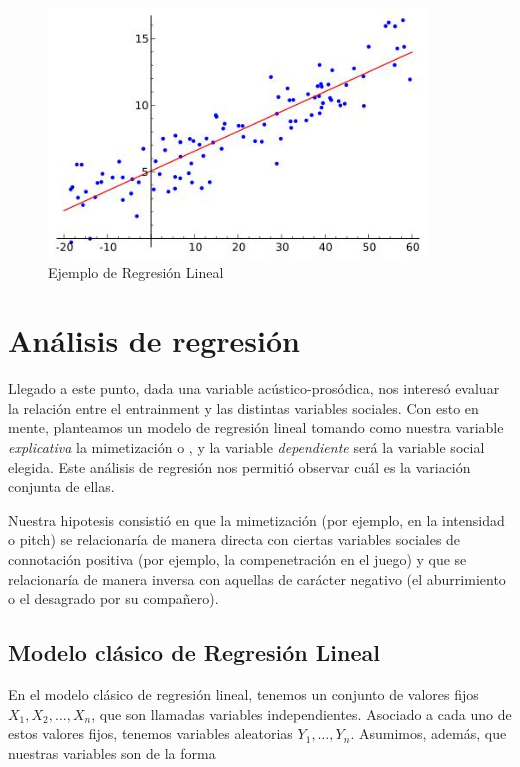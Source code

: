 
\begin{figure}[h!]
\centering
\includegraphics[width=10cm]{images/linear_regression.jpg}
\caption{Ejemplo de Regresión Lineal}
\end{figure}

\section{Análisis de regresión}

Llegado a este punto, dada una variable acústico-prosódica, nos interesó evaluar la relación entre el entrainment y las distintas variables sociales. Con esto en mente, planteamos un modelo de regresión lineal tomando como nuestra variable \emph{explicativa} la mimetización o \entrainment, y la variable \emph{dependiente} será la variable social elegida. Este análisis de regresión nos permitió observar cuál es la variación conjunta de ellas.

Nuestra hipotesis consistió en que la mimetización (por ejemplo, en la intensidad o pitch) se relacionaría de manera directa con ciertas variables sociales de connotación positiva (por ejemplo, la compenetración en el juego) y que se relacionaría de manera inversa con aquellas de carácter negativo (el aburrimiento o el desagrado por su compañero).


\subsection{Modelo clásico de Regresión Lineal}

En el modelo clásico de regresión lineal, tenemos un conjunto de valores fijos $X_1, X_2, \ldots, X_n$, que son llamadas variables independientes. Asociado a cada uno de estos valores fijos, tenemos variables aleatorias $Y_1, \ldots, Y_n$. Asumimos, además, que nuestras variables son de la forma

